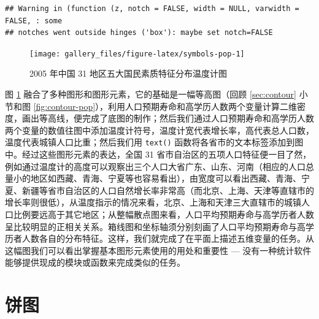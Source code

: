 \documentclass[
  b5paper,
  UTF8,twoside]{book}
\begin{document}
\begin{verbatim}
## Warning in (function (z, notch = FALSE, width = NULL, varwidth = FALSE, : some
## notches went outside hinges ('box'): maybe set notch=FALSE
\end{verbatim}

\begin{figure}

{\centering \texttt{[image: gallery\_files/figure-latex/symbols-pop-1]} 

}

\caption[中国 31 地区五大国民素质特征分布温度计图]{2005 年中国 31 地区五大国民素质特征分布温度计图}\label{fig:symbols-pop}
\end{figure}

图 \ref{fig:symbols-pop} \citep{Xie08} 融合了多种图形和图形元素，它的基础是一幅等高图（回顾 \ref{sec:contour} 小节和图 \ref{fig:contour-pop}），利用人口预期寿命和高学历人数两个变量计算二维密度，画出等高线，便完成了底图的制作；然后我们通过人口预期寿命和高学历人数两个变量的数值往图中添加温度计符号，温度计宽代表增长率，高代表总人口数，温度代表城镇人口比重；然后我们用 \texttt{text()} 函数将各省市的文本标签添加到图中。经过这些图形元素的表达，全国 31 省市自治区的五项人口特征便一目了然，例如通过温度计的高度可以观察出三个人口大省广东、山东、河南（相应的人口总量小的地区如西藏、青海、宁夏等也容易看出），由宽度可以看出西藏、青海、宁夏、新疆等省市自治区的人口自然增长率非常高（而北京、上海、天津等直辖市的增长率则很低），从温度指示的情况来看，北京、上海和天津三大直辖市的城镇人口比例要远高于其它地区；从整幅散点图来看，人口平均预期寿命与高学历者人数呈比较明显的正相关关系。箱线图和坐标轴须分别刻画了人口平均预期寿命与高学历者人数各自的分布特征。这样，我们就完成了在平面上描述五维变量的任务。从这幅图我们可以看出掌握基本图形元素使用的用处和重要性 --- 没有一种统计软件能够提供现成的模块或函数来完成类似的任务。

\section{饼图}\label{sec:pie}
\end{document}
